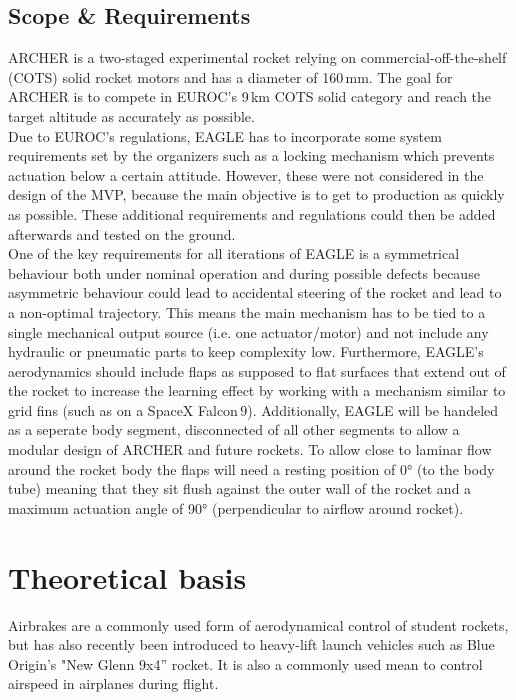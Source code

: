 \documentclass[fontsize=11pt,%
twoside,%
BCOR          = 8mm, %
DIV           = 11,  %
titlepage     = off,%
index=totoc,%
xcolor        = pdftex,%
dvipsnames,%
bibliography  = totoc,%
bibliography = numbered, %
listof        = notnumbered]{scrreprt}
\begin{document}
\section{Scope \& Requirements} \label{requirements}
ARCHER is a two-staged experimental rocket relying on commercial-off-the-shelf (COTS) solid rocket motors and has a diameter of 160\,mm. The goal for ARCHER is to compete in EUROC's 9\,km COTS solid category and reach the target altitude as accurately as possible.\\
Due to EUROC's regulations, EAGLE has to incorporate some system requirements set by the organizers such as a locking mechanism which prevents actuation below a certain attitude. However, these were not considered in the design of the MVP, because the main objective is to get to production as quickly as possible. These additional requirements and regulations could then be added afterwards and tested on the ground.\\
One of the key requirements for all iterations of EAGLE is a symmetrical behaviour both under nominal operation and during possible defects because asymmetric behaviour could lead to accidental steering of the rocket and lead to a non-optimal trajectory. This means the main mechanism has to be tied to a single mechanical output source (i.e. one actuator/motor) and not include any hydraulic or pneumatic parts to keep complexity low. Furthermore, EAGLE's aerodynamics should include flaps as supposed to flat surfaces that extend out of the rocket to increase the learning effect by working with a mechanism similar to grid fins (such as on a SpaceX Falcon$\,9$). Additionally, EAGLE will be handeled as a seperate body segment, disconnected of all other segments to allow a modular design of ARCHER and future rockets. To allow close to laminar flow around the rocket body the flaps will need a resting position of 0° (to the body tube) meaning that they sit flush against the outer wall of the rocket and a maximum actuation angle of 90° (perpendicular to airflow around rocket).

\newpage
\chapter{Theoretical basis}
Airbrakes are a commonly used form of aerodynamical control of student rockets, but has also recently been introduced to heavy-lift launch vehicles such as Blue Origin's "New Glenn 9x4'' rocket. It is also a commonly used mean to control airspeed in airplanes during flight.
\end{document}
